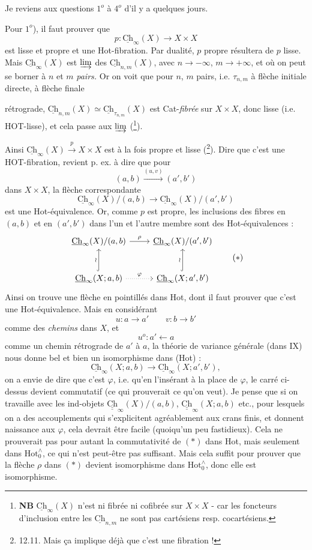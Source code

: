 \documentclass[11pt]{article}
\newcommand{\printedpage}[1]{\marginpar{\footnotesize p.~#1}}
\newcommand{\msp}[1]{\marginpar{\footnotesize [#1]}}
\newcommand{\Hotz}{\mathrm{Hot}^{\wedge}_{0}}
\newcommand{\Ch}{\underline{\mathrm{Ch}}}
\newcommand{\CCh}{\underline{\underline{\mathrm{Ch}}}}
\begin{document}
Je reviens aux questions $1^o$ à $4^o$ d'il y a quelques jours.

Pour $1^o$), il faut prouver que
\[
p : \Ch_{\infty}(X) \longrightarrow X \times X
\]
est lisse et propre et une Hot-fibration. Par dualité, $p$ propre résultera de $p$ lisse. Mais $\Ch_{\infty}(X)$ est $\varinjlim$ des $\Ch_{n,m}(X)$, avec $n \longrightarrow -\infty$, $m \longrightarrow +\infty$, et où on peut se borner à $n$ et $m$ \textit{pairs.} Or on voit que pour $n$, $m$ pairs, i.e. $\tau_{n,m}$ à flèche initiale directe, à flèche finale

\printedpage{94}
rétrograde, $\Ch_{n,m}(X) \simeq \Ch_{\tau_{n,m}}(X)$ est Cat-\textit{fibrée} sur $X \times X$, donc lisse (i.e. HOT-lisse), et cela passe aux $\varinjlim$ (\footnote[36]{\textbf{NB} $\Ch_\infty(X)$ n'est ni fibrée ni cofibrée sur $X \times X$ - car les foncteurs d'inclusion entre les $\Ch_{n,m}$ ne sont pas cartésiens resp. cocartésiens.}).

Ainsi $\Ch_\infty(X) \xrightarrow{p} X \times X$ est à la fois propre et lisse (\footnote[37]{12.11. Mais ça implique déjà que c'est une fibration !}). Dire que c'est une HOT-fibration, revient p. ex. à dire que pour
\[
(a,b) \xrightarrow{(u,v)} (a',b')
\]
dans $X \times X$, la flèche correspondante
\[
\Ch_\infty(X)/(a,b) \longrightarrow \Ch_\infty(X)/(a',b')
\]
est une Hot-équivalence. Or, comme $p$ est propre, les inclusions des fibres en $(a,b)$ et en $(a',b')$ dans l'un et l'autre membre sont des Hot-équivalences :
\msp{page 151}
\[
\begin{tikzcd}[row sep=large]
\Ch_\infty(X)/(a,b) \arrow[r, "\rho"] & \Ch_\infty(X)/(a',b') \\
\Ch_\infty(X;a,b) \arrow[u, hook, "\wr"] \arrow[r, dotted, "\varphi"] & \Ch_\infty(X;a',b') \arrow[u, hook, "\wr"]
\end{tikzcd}
\tag*{$(*)$}
\]
Ainsi on trouve une flèche en pointillés dans Hot, dont il faut prouver que c'est une Hot-équivalence. Mais en considérant
\[
u : a \longrightarrow a' \qquad v : b \longrightarrow b'
\]
comme des \textit{chemins} dans $X$, et
\[
u^o : a' \longleftarrow a
\]
comme un chemin rétrograde de $a'$ à $a$, la théorie de variance générale (dans IX) nous donne bel et bien un isomorphisme dans (Hot) :
\[
\Ch_\infty(X;a,b) \longrightarrow \Ch_\infty(X;a',b'),
\]
on a envie de dire que c'est $\varphi$, i.e. qu'en l'insérant à la place de $\varphi$, le carré ci-dessus devient commutatif (ce qui prouverait ce qu'on veut). Je pense que si on travaille avec les ind-objets $\CCh_\infty(X)/(a,b)$, $\CCh_\infty(X;a,b)$ etc., pour lesquels on a des accouplements qui s'explicitent agréablement aux crans finis, et donnent naissance aux $\varphi$, cela devrait être facile (quoiqu'un peu fastidieux). Cela ne prouverait pas pour autant la commutativité de $(*)$ dans Hot, mais
\printedpage{95}
\msp{page 152}
seulement dans $\Hotz$, ce qui n'est peut-être pas suffisant. Mais cela suffit pour prouver que la flèche $\rho$ dans $(*)$ devient isomorphisme dans $\Hotz$, donc elle est isomorphisme.
\end{document}
